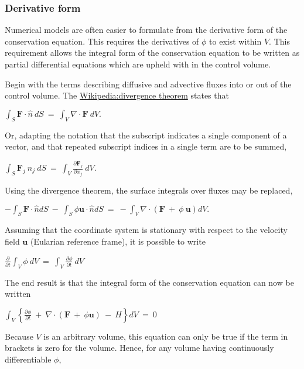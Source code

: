 \subsubsection{Derivative form}

Numerical models are often easier to formulate from the derivative form
of the conservation equation. This requires the derivatives of $\phi$ to
exist within $V$. This requirement allows the integral form of the
conservation equation to be written as partial differential equations
which are upheld with in the control volume.

Begin with the terms describing diffusive and advective fluxes into or
out of the control volume. The
\href{Wikipedia:divergence theorem}{Wikipedia:divergence theorem} states
that

$
{ \int }_{S} {\mathbf F} {\cdot} \hat{n} ~dS~ = ~{ \int }_{V} \nabla 
    {\cdot} {\mathbf F} ~dV. 
$

Or, adapting the notation that the subscript indicates a single
component of a vector, and that repeated subscript indices in a single
term are to be summed,

$
{ \int }_{ S} {\mathbf F}_{ j} ~n_{ j} ~dS~ = ~{ \int }_{ V} {\frac{
    \partial {\mathbf F}_{ j} }{ \partial x_{ j} }} ~dV.
$

Using the divergence theorem, the surface integrals over fluxes may be
replaced,

$
-{ \int }_{ S} {\mathbf F} {\cdot} \hat{n}dS~ - ~{ \int }_{ S} \phi {\mathbf u}
    {\cdot}\hat{n} dS~ = ~ -{ \int }_{ V} \nabla {\cdot} \left ( {
    {\mathbf F}~ + ~ \phi ~ {\mathbf u}} \right )dV.
$

Assuming that the coordinate system is stationary with respect to the
velocity field $\mathbf{u}$ (Eularian reference frame), it is possible
to write

$
{\frac{ \partial}{ \partial t}} { \int }_{ V} \phi ~dV~ = ~{ \int }_{ V}
    {\frac{ \partial \phi }{ \partial t}} ~dV~
$

The end result is that the integral form of the conservation equation
can now be written

$
{ \int }_{ V} \left\{ {{\frac{ \partial \phi }{ \partial t}}
    ~ + ~ \nabla {\cdot} \left ( { {\mathbf F}~ + ~ \phi {\mathbf u}} \right ) ~
    - ~ H} \right\} dV~ = ~ 0
$

Because $V$ is an arbitrary volume, this equation can only be true if
the term in brackets is zero for the volume. Hence, for any volume
having continuously differentiable $\phi$,

